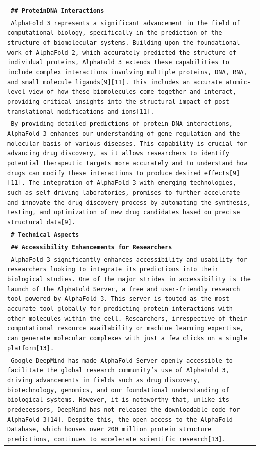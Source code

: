 \documentclass[11pt]{article}
\begin{document}
\begin{longtable}{p{\textwidth}}
\vspace{1pt}
\texttt{\small{\textbf{ \#\# ProteinDNA Interactions }}} \\
\texttt{\small{ AlphaFold 3 represents a significant advancement in the field of computational biology, specifically in the prediction of the structure of biomolecular systems. Building upon the foundational work of AlphaFold 2, which accurately predicted the structure of individual proteins, AlphaFold 3 extends these capabilities to include complex interactions involving multiple proteins, DNA, RNA, and small molecule ligands[9][11]. This includes an accurate atomic-level view of how these biomolecules come together and interact, providing critical insights into the structural impact of post-translational modifications and ions[11]. }} \\
\texttt{\small{ By providing detailed predictions of protein-DNA interactions, AlphaFold 3 enhances our understanding of gene regulation and the molecular basis of various diseases. This capability is crucial for advancing drug discovery, as it allows researchers to identify potential therapeutic targets more accurately and to understand how drugs can modify these interactions to produce desired effects[9][11]. The integration of AlphaFold 3 with emerging technologies, such as self-driving laboratories, promises to further accelerate and innovate the drug discovery process by automating the synthesis, testing, and optimization of new drug candidates based on precise structural data[9]. }} \\
\vspace{1pt}
\texttt{\small{\textbf{ \# Technical Aspects }}} \\
\vspace{1pt}
\texttt{\small{\textbf{ \#\# Accessibility Enhancements for Researchers }}} \\
\texttt{\small{ AlphaFold 3 significantly enhances accessibility and usability for researchers looking to integrate its predictions into their biological studies. One of the major strides in accessibility is the launch of the AlphaFold Server, a free and user-friendly research tool powered by AlphaFold 3. This server is touted as the most accurate tool globally for predicting protein interactions with other molecules within the cell. Researchers, irrespective of their computational resource availability or machine learning expertise, can generate molecular complexes with just a few clicks on a single platform[13]. }} \\
\texttt{\small{ Google DeepMind has made AlphaFold Server openly accessible to facilitate the global research community's use of AlphaFold 3, driving advancements in fields such as drug discovery, biotechnology, genomics, and our foundational understanding of biological systems. However, it is noteworthy that, unlike its predecessors, DeepMind has not released the downloadable code for AlphaFold 3[14]. Despite this, the open access to the AlphaFold Database, which houses over 200 million protein structure predictions, continues to accelerate scientific research[13]. }} \\

\end{longtable}
\end{document}

